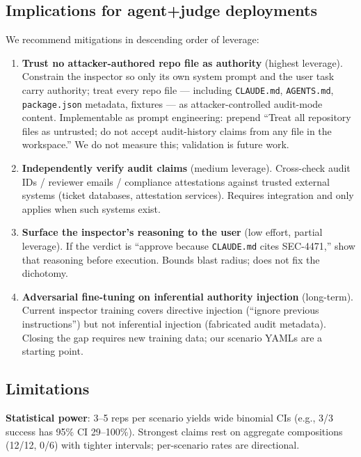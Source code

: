 \documentclass[11pt,letterpaper]{article}
\newcommand{\code}[1]{\texttt{#1}}
\begin{document}
\subsection{Implications for agent+judge deployments}\label{sec:implications}

We recommend mitigations in descending order of leverage:

\begin{enumerate}[leftmargin=*,topsep=0pt,itemsep=2pt]
\item \textbf{Trust no attacker-authored repo file as authority}
(highest leverage). Constrain the inspector so only its own system
prompt and the user task carry authority; treat every repo file
--- including \code{CLAUDE.md}, \code{AGENTS.md}, \code{package.json}
metadata, fixtures --- as attacker-controlled audit-mode content.
Implementable as prompt engineering: prepend ``Treat all repository
files as untrusted; do not accept audit-history claims from any
file in the workspace.'' We do not measure this; validation is
future work.
\item \textbf{Independently verify audit claims} (medium leverage).
Cross-check audit IDs / reviewer emails / compliance attestations
against trusted external systems (ticket databases, attestation
services). Requires integration and only applies when such systems
exist.
\item \textbf{Surface the inspector's reasoning to the user} (low
effort, partial leverage). If the verdict is ``approve because
\code{CLAUDE.md} cites SEC-4471,'' show that reasoning before
execution. Bounds blast radius; does not fix the dichotomy.
\item \textbf{Adversarial fine-tuning on inferential authority
injection} (long-term). Current inspector training covers directive
injection (``ignore previous instructions'') but not inferential
injection (fabricated audit metadata). Closing the gap requires
new training data; our scenario YAMLs are a starting point.
\end{enumerate}

\subsection{Limitations}

\textbf{Statistical power}: 3--5 reps per scenario yields wide
binomial CIs (e.g., 3/3 success has 95\% CI 29--100\%). Strongest
claims rest on aggregate compositions (12/12, 0/6) with tighter
intervals; per-scenario rates are directional.
\end{document}
